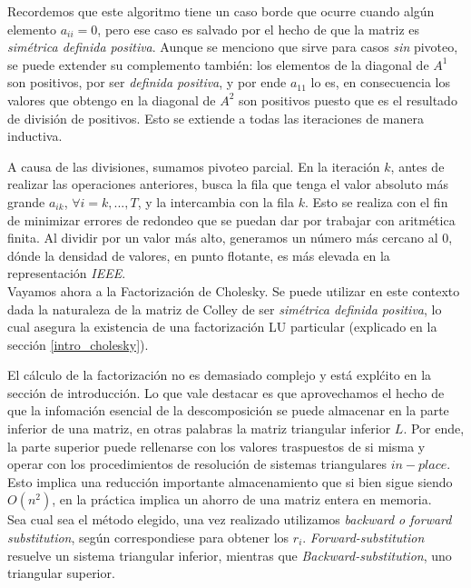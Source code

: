 Recordemos que este algoritmo tiene un caso borde que ocurre cuando alg\'un elemento $a_{ii} = 0$, pero ese caso es salvado por el hecho de que la matriz es \textit{sim\'etrica definida positiva}. Aunque se menciono que sirve para casos \textit{sin} pivoteo, se puede extender su complemento tambi\'en: los elementos de la diagonal de $A^{1}$ son positivos, por ser \textit{definida positiva}, y por ende $a_{11}$ lo es, en consecuencia los valores que obtengo en la diagonal de $A^{2}$ son positivos puesto que es el resultado de divisi\'on de positivos. Esto se extiende a todas las iteraciones de manera inductiva.

A causa de las divisiones, sumamos pivoteo parcial. En la iteraci\'on $k$, antes de realizar las operaciones anteriores, busca la fila que tenga el valor absoluto m\'as grande $a_{ik}$, $\forall i = k, ..., T$, y la intercambia con la fila $k$. Esto se realiza con el fin de minimizar errores de redondeo que se puedan dar por trabajar con aritm\'etica finita. Al dividir por un valor más alto, generamos un número más cercano al $0$, d\'onde la densidad de valores, en punto flotante, es m\'as elevada en la representaci\'on \textit{IEEE}. \\

Vayamos ahora a la Factorizaci\'on de Cholesky. Se puede utilizar en este contexto dada la naturaleza de la matriz de Colley de ser \textit{sim\'etrica definida positiva}, lo cual asegura la existencia de una factorizaci\'on LU particular (explicado en la secci\'on \ref{intro_cholesky}).

El c\'alculo de la factorizaci\'on no es demasiado complejo y est\'a expl\'cito en la secci\'on de introducci\'on. Lo que vale destacar es que aprovechamos el hecho de que la infomaci\'on esencial de la descomposici\'on se puede almacenar en la parte inferior de una matriz, en otras palabras la matriz triangular inferior $L$. Por ende, la parte superior puede rellenarse con los valores traspuestos de si misma y operar con los procedimientos de resoluci\'on de sistemas triangulares $in-place$. Esto implica una reducci\'on importante almacenamiento que si bien sigue siendo $O(n^2)$, en la pr\'actica implica un ahorro de una matriz entera en memoria. \\

Sea cual sea el m\'etodo elegido, una vez realizado utilizamos \textit{backward o forward substitution}, seg\'un correspondiese para obtener los $r_{i}$. \textit{Forward-substitution} resuelve un sistema triangular inferior, mientras que \textit{Backward-substitution}, uno triangular superior. \\


